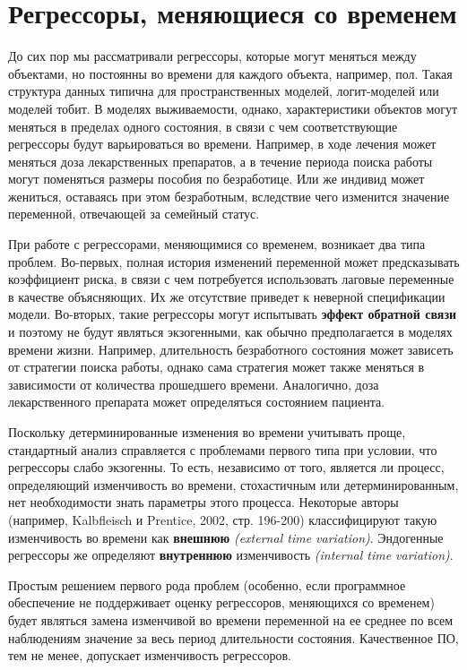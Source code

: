 \section{Регрессоры, меняющиеся со временем}\label{sec:17.9}

\noindent
До сих пор мы рассматривали регрессоры, которые могут меняться между объектами, но постоянны во времени для каждого объекта, например, пол. Такая структура данных типична для пространственных моделей, логит-моделей или моделей тобит. В моделях выживаемости, однако, характеристики объектов могут меняться в пределах одного состояния, в связи с чем соответствующие регрессоры будут варьироваться во времени. Например, в ходе лечения может меняться доза лекарственных препаратов, а в течение периода поиска работы могут поменяться размеры пособия по безработице. Или же индивид может жениться, оставаясь при этом безработным, вследствие чего изменится значение переменной, отвечающей за семейный статус.

При работе с регрессорами, меняющимися со временем, возникает два типа проблем. Во-первых, полная история изменений переменной может предсказывать коэффициент риска, в связи с чем потребуется использовать лаговые переменные в качестве объясняющих. Их же отсутствие приведет к неверной спецификации модели. Во-вторых, такие регрессоры могут испытывать \textbf{эффект обратной связи} и поэтому не будут являться экзогенными, как обычно предполагается в моделях времени жизни. Например, длительность безработного состояния может зависеть от стратегии поиска работы, однако сама стратегия может также меняться в зависимости от количества прошедшего времени. Аналогично, доза лекарственного препарата может определяться состоянием пациента.

Поскольку детерминированные изменения во времени учитывать проще, стандартный анализ справляется с проблемами первого типа при условии, что регрессоры слабо экзогенны. То есть, независимо от того, является ли процесс, определяющий изменчивость во времени, стохастичным или детерминированным, нет необходимости знать параметры этого процесса. Некоторые авторы (например, Kalbfleisch и Prentice, 2002, стр. 196-200) классифицируют такую изменчивость во времени как \textbf{внешнюю} \textit{(external time variation)}. Эндогенные регрессоры же определяют \textbf{внутреннюю} изменчивость \textit{(internal time variation)}.

Простым решением первого рода проблем (особенно, если программное обеспечение не поддерживает оценку регрессоров, меняющихся со временем) будет являться замена изменчивой во времени переменной на ее среднее по всем наблюдениям значение за весь период длительности состояния. Качественное ПО, тем не менее, допускает изменчивость регрессоров.

